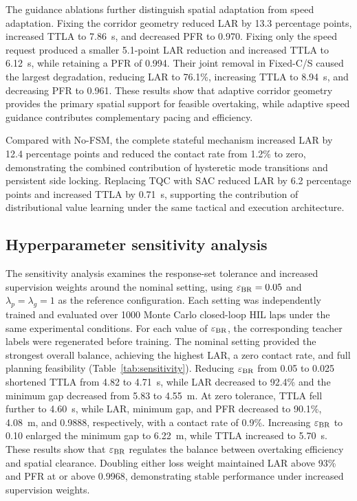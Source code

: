 \documentclass[sensors,article,submit,moreauthors]{Definitions/mdpi}
\begin{document}
The guidance ablations further distinguish spatial adaptation from speed
adaptation. Fixing the corridor geometry reduced LAR by 13.3 percentage points,
increased TTLA to 7.86~s, and decreased PFR to 0.970. Fixing only the speed
request produced a smaller 5.1-point LAR reduction and increased TTLA to
6.12~s, while retaining a PFR of 0.994. Their joint removal in Fixed-C/S
caused the largest degradation, reducing LAR to 76.1\%, increasing TTLA to
8.94~s, and decreasing PFR to 0.961. These results show that adaptive corridor
geometry provides the primary spatial support for feasible overtaking, while
adaptive speed guidance contributes complementary pacing and efficiency.

Compared with No-FSM, the complete stateful mechanism increased LAR by
12.4 percentage points and reduced the contact rate from 1.2\% to zero,
demonstrating the combined contribution of hysteretic mode transitions and
persistent side locking. Replacing TQC with SAC reduced LAR by 6.2 percentage
points and increased TTLA by 0.71~s, supporting the contribution of
distributional value learning under the same tactical and execution
architecture.




\subsection{Hyperparameter sensitivity analysis}
\label{subsec:sensitivity}

The sensitivity analysis examines the response-set tolerance and increased
supervision weights around the nominal setting, using
$\varepsilon_{\rm BR}=0.05$ and
$\lambda_p=\lambda_g=1$ as the reference configuration. Each setting was
independently trained and evaluated over 1000 Monte Carlo closed-loop HIL laps
under the same experimental conditions. For each value of
$\varepsilon_{\rm BR}$, the corresponding teacher labels were regenerated
before training.
The nominal setting provided the strongest overall balance, achieving the
highest LAR, a zero contact rate, and full planning feasibility
(Table~\ref{tab:sensitivity}). Reducing $\varepsilon_{\rm BR}$ from 0.05 to
0.025 shortened TTLA from 4.82 to 4.71~s, while LAR decreased to 92.4\% and
the minimum gap decreased from 5.83 to 4.55~m. At zero tolerance, TTLA fell
further to 4.60~s, while LAR, minimum gap, and PFR decreased to 90.1\%,
4.08~m, and 0.9888, respectively, with a contact rate of 0.9\%. Increasing
$\varepsilon_{\rm BR}$ to 0.10 enlarged the minimum gap to 6.22~m, while
TTLA increased to 5.70~s. These results show that $\varepsilon_{\rm BR}$
regulates the balance between overtaking efficiency and spatial clearance.
Doubling either loss weight maintained LAR above 93\% and PFR at or above
0.9968, demonstrating stable performance under increased supervision weights.
\end{document}
